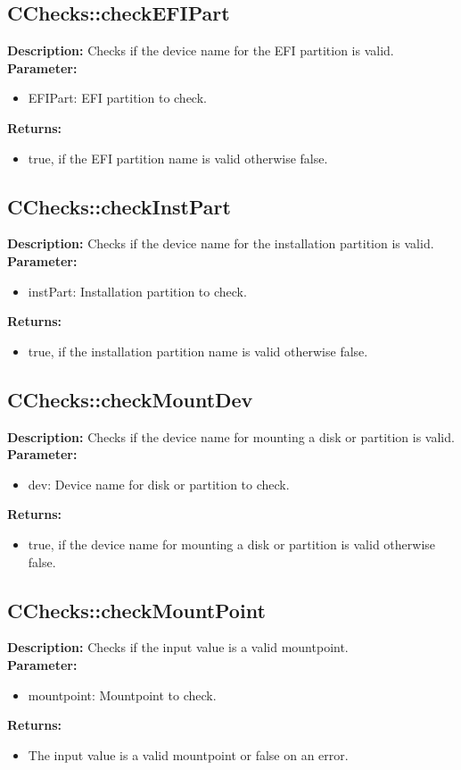 \subsection{CChecks::checkEFIPart}
\textbf{Description:} Checks if the device name for the EFI partition is valid.\\
\textbf{Parameter:}
\begin{itemize}
\item EFIPart: EFI partition to check.
\end{itemize}
\textbf{Returns:}
\begin{itemize}
\item true, if the EFI partition name is valid otherwise false.
\end{itemize}

\subsection{CChecks::checkInstPart}
\textbf{Description:} Checks if the device name for the installation partition is valid.\\
\textbf{Parameter:}
\begin{itemize}
\item instPart: Installation partition to check.
\end{itemize}
\textbf{Returns:}
\begin{itemize}
\item true, if the installation partition name is valid otherwise false.
\end{itemize}

\subsection{CChecks::checkMountDev}
\textbf{Description:} Checks if the device name for mounting a disk or partition is valid.\\
\textbf{Parameter:}
\begin{itemize}
\item dev: Device name for disk or partition to check.
\end{itemize}
\textbf{Returns:}
\begin{itemize}
\item true, if the device name for mounting a disk or partition is valid otherwise false.
\end{itemize}

\subsection{CChecks::checkMountPoint}
\textbf{Description:} Checks if the input value is a valid mountpoint.\\
\textbf{Parameter:}
\begin{itemize}
\item mountpoint: Mountpoint to check.
\end{itemize}
\textbf{Returns:}
\begin{itemize}
\item The input value is a valid mountpoint or false on an error.
\end{itemize}

